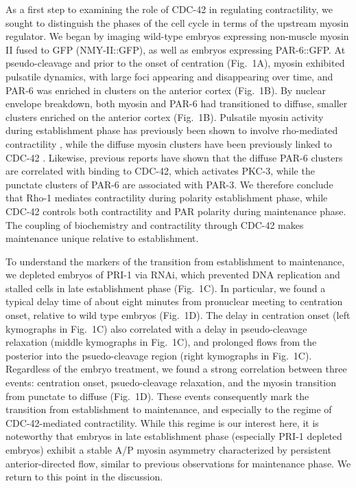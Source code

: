 \documentclass[11pt]{article}
\newcommand{\6}[1]{#1_{\text{6}}}
\newcommand{\3}[1]{#1_{\text{3}}}
\begin{document}
As a first step to examining the role of CDC-42 in regulating contractility, we sought to distinguish the phases of the cell cycle in terms of the upstream myosin regulator. We began by imaging wild-type embryos expressing non-muscle myosin II fused to GFP (NMY-II::GFP), as well as embryos expressing PAR-6::GFP. At pseudo-cleavage and prior to the onset of centration (Fig.\ 1A), myosin exhibited pulsatile dynamics, with large foci appearing and disappearing over time, and PAR-6 was enriched in clusters on the anterior cortex (Fig.\ 1B). By nuclear envelope breakdown, both myosin and PAR-6 had transitioned to diffuse, smaller clusters enriched on the anterior cortex (Fig.\ 1B). Pulsatile myosin activity during establishment phase has previously been shown to involve rho-mediated contractility \citep{michaux2018excitable, michaud2022versatile, yao2022modulating}, while the diffuse myosin clusters have been previously linked to CDC-42 \citep{motegi2006sequential}. Likewise, previous reports \citep{motegi2006sequential, rodriguez2017apkc} have shown that the diffuse PAR-6 clusters are correlated with binding to CDC-42, which activates PKC-3, while the punctate clusters of PAR-6 are associated with PAR-3. We therefore conclude that Rho-1 mediates contractility during polarity establishment phase, while CDC-42 controls both contractility and PAR polarity during maintenance phase. The coupling of biochemistry and contractility through CDC-42 makes maintenance unique relative to establishment.

To understand the markers of the transition from establishment to maintenance, we depleted embryos of PRI-1 via RNAi, which prevented DNA replication and stalled cells in late establishment phase (Fig.\ 1C). In particular, we found a typical delay time of about eight minutes from pronuclear meeting to centration onset, relative to wild type embryos (Fig.\ 1D). The delay in centration onset (left kymographs in Fig.\ 1C) also correlated with a delay in pseudo-cleavage relaxation (middle kymographs in Fig.\ 1C), and prolonged flows from the posterior into the psuedo-cleavage region (right kymographs in Fig.\ 1C). Regardless of the embryo treatment, we found a strong correlation between three events: centration onset, psuedo-cleavage relaxation, and the myosin transition from punctate to diffuse (Fig.\ 1D). These events consequently mark the transition from establishment to maintenance, and especially to the regime of CDC-42-mediated contractility. While this regime is our interest here, it is noteworthy that embryos in late establishment phase (especially PRI-1 depleted embryos) exhibit a stable A/P myosin asymmetry characterized by persistent anterior-directed flow, similar to previous observations for maintenance phase. We return to this point in the discussion.
\end{document}
